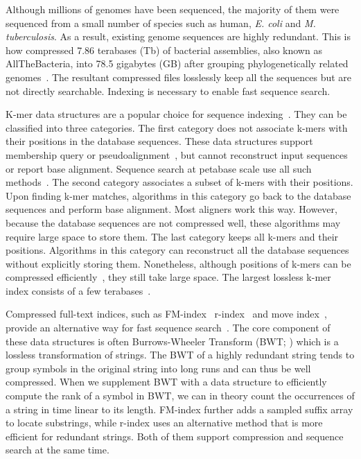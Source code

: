 \documentclass[webpdf,contemporary,large,namedate]{oup-authoring-template}%
\begin{document}
Although millions of genomes have been sequenced,
the majority of them were sequenced from a small number of species such as human, \emph{E. coli} and \emph{M. tuberculosis}.
As a result, existing genome sequences are highly redundant.
This is how \citet{Hunt2024.03.08.584059} compressed 7.86 terabases (Tb) of bacterial assemblies, also known as AllTheBacteria, into 78.5 gigabytes (GB)
after grouping phylogenetically related genomes~\citep{Brinda:2024aa}.
The resultant compressed files losslessly keep all the sequences but are not directly searchable.
Indexing is necessary to enable fast sequence search.

K-mer data structures are a popular choice for sequence indexing~\citep{Marchet:2021aa}.
They can be classified into three categories.
The first category does not associate k-mers with their positions in the database sequences.
These data structures support membership query or pseudoalignment~\citep{Bray:2016aa},
but cannot reconstruct input sequences or report base alignment.
Sequence search at petabase scale use all such methods~\citep{Edgar:2022aa,Karasikov2020.10.01.322164,Shiryev:2024aa}.
The second category associates a subset of k-mers with their positions.
Upon finding k-mer matches, algorithms in this category go back to the database sequences and perform base alignment.
Most aligners work this way.
However, because the database sequences are not compressed well,
these algorithms may require large space to store them.
The last category keeps all k-mers and their positions.
Algorithms in this category can reconstruct all the database sequences without explicitly storing them.
Nonetheless, although positions of k-mers can be compressed efficiently~\citep{Karasikov:2020aa},
they still take large space.
The largest lossless k-mer index consists of a few terabases~\citep{Karasikov2020.10.01.322164}.

Compressed full-text indices, such as FM-index~\citep{DBLP:conf/focs/FerraginaM00} r-index~\citep{DBLP:conf/soda/GagieNP18,DBLP:journals/tcs/BannaiGI20,DBLP:journals/jacm/GagieNP20}
and move index~\citep{DBLP:conf/icalp/NishimotoT21},
provide an alternative way for fast sequence search~\citep{DBLP:journals/csur/Navarro21}.
The core component of these data structures is often Burrows-Wheeler Transform (BWT; \citealt*{Burrows:1994aa})
which is a lossless transformation of strings.
The BWT of a highly redundant string tends to group symbols in the original string into long runs
and can thus be well compressed.
When we supplement BWT with a data structure to efficiently compute the rank of a symbol in BWT,
we can in theory count the occurrences of a string in time linear to its length.
FM-index further adds a sampled suffix array to locate substrings,
while r-index uses an alternative method that is more efficient for redundant strings.
Both of them support compression and sequence search at the same time.
\end{document}
